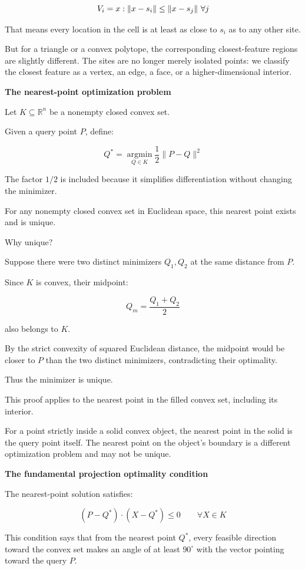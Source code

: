 \[
V_i=\\{x:\|x-s_i\|\le\|x-s_j\|\ \forall j\\}
\]

That means every location in the cell is at least as close to \(s_i\) as to any other site.

But for a triangle or a convex polytope, the corresponding closest-feature regions are slightly different. The sites are no longer merely isolated points: we classify the closest feature as a vertex, an edge, a face, or a higher-dimensional interior.

\textbf{The nearest-point optimization problem}

Let \(K\subseteq\mathbb R^n\) be a nonempty closed convex set.

Given a query point \(P\), define:

\[
\boxed{ Q^*=\underset{Q\in K}{\operatorname{argmin}}\frac12\|P-Q\|^2 }
\]

The factor \(1/2\) is included because it simplifies differentiation without changing the minimizer.

For any nonempty closed convex set in Euclidean space, this nearest point exists and is unique.

Why unique?

Suppose there were two distinct minimizers \(Q_1,Q_2\) at the same distance from \(P\).

Since \(K\) is convex, their midpoint:

\[
Q_m=\frac{Q_1+Q_2}{2}
\]

also belongs to \(K\).

By the strict convexity of squared Euclidean distance, the midpoint would be closer to \(P\) than the two distinct minimizers, contradicting their optimality.

Thus the minimizer is unique.

This proof applies to the nearest point in the filled convex set, including its interior.

For a point strictly inside a solid convex object, the nearest point in the solid is the query point itself. The nearest point on the object's boundary is a different optimization problem and may not be unique.

\textbf{The fundamental projection optimality condition}

The nearest-point solution satisfies:

\[
\boxed{ (P-Q^*)\cdot(X-Q^*)\le0 \qquad\forall X\in K }
\]

This condition says that from the nearest point \(Q^*\), every feasible direction toward the convex set makes an angle of at least \(90^\circ\) with the vector pointing toward the query \(P\).

